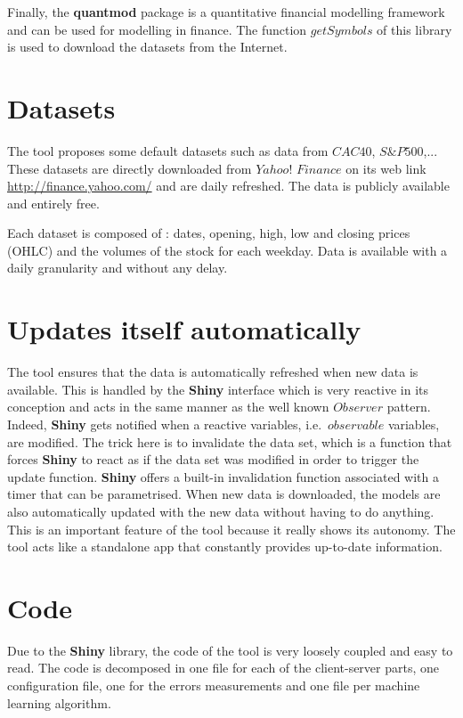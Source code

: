 \documentclass[11pt,a4paper,oneside]{book}
\begin{document}
Finally, the \textbf{quantmod} \cite{quantmod} package is a quantitative financial modelling framework and can be used for modelling in finance. The function $getSymbols$ of this library is used to download the datasets from the Internet.



\section{Datasets}\label{datasets}

The tool proposes some default datasets such as data from $CAC40$, $S\&P 500$,... These datasets are directly downloaded from $Yahoo!$ $Finance$ on its web link \url{http://finance.yahoo.com/} \cite{yahoo} and are daily refreshed. The data is publicly available and entirely free. 

Each dataset is composed of : dates, opening, high, low and closing prices (OHLC) and the volumes of the stock for each weekday. Data is available with a daily granularity and without any delay.


\section{Updates itself automatically}

The tool ensures that the data is automatically refreshed when new data is available. This is handled by the \textbf{Shiny} interface which is very reactive in its conception and acts in the same manner as the well known $Observer$ pattern. Indeed, \textbf{Shiny} gets notified when a reactive variables, i.e.\ $observable$ variables, are modified. The trick here is to invalidate the data set, which is a function that forces \textbf{Shiny} to react as if the data set was modified in order to trigger the update function. \textbf{Shiny} offers a built-in invalidation function associated with a timer that can be parametrised. When new data is downloaded, the models are also automatically updated with the new data without having to do anything. This is an important feature of the tool because it really shows its autonomy. The tool acts like a standalone app that constantly provides up-to-date information. 


\section{Code}

Due to the \textbf{Shiny} library, the code of the tool is very loosely coupled and easy to read. The code is decomposed in one file for each of the client-server parts, one configuration file, one for the errors measurements and one file per machine learning algorithm. 
\end{document}
